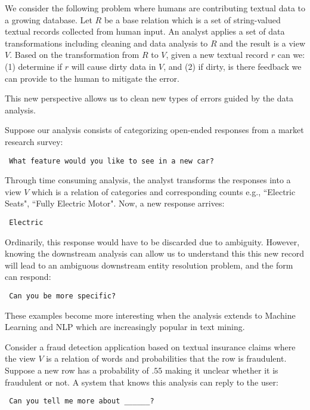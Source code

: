 We consider the following problem where humans are contributing textual data to a growing database. 
Let $R$ be a base relation which is a set of string-valued textual records collected from human input.
An analyst applies a set of data transformations including cleaning and data analysis to $R$ and the result is a view $V$.
Based on the transformation from $R$ to $V$, given a new textual record $r$ can we: (1) determine if $r$ will cause dirty data in $V$, and (2) if dirty, is there feedback we can provide to the human to mitigate the error. 

This new perspective allows us to clean new types of errors guided by the data analysis.
\begin{example}[Ambiguity]
Suppose our analysis consists of categorizing open-ended responses from a market research survey:

\vspace{0.5em}
\noindent \texttt{
What feature would you like to see in a new car?
}
\vspace{0.5em}

Through time consuming analysis, the analyst transforms the responses into a view $V$ which is a relation of categories and corresponding counts e.g., ``Electric Seats", ``Fully Electric Motor". 
Now, a new response arrives:

\vspace{0.5em}
\noindent \texttt{
Electric
}
\vspace{0.5em}

Ordinarily, this response would have to be discarded due to ambiguity.
However, knowing the downstream analysis can allow us to understand this this new record will lead to an ambiguous downstream entity resolution problem, and the form can respond:

\vspace{0.5em}
\noindent \texttt{
Can you be more specific? 
}

\end{example} 
These examples become more interesting when the analysis extends to Machine Learning and NLP which are increasingly popular in text mining. 
\begin{example}
Consider a fraud detection application based on textual insurance claims where the view $V$ is a relation of words and probabilities that the row is fraudulent.
Suppose a new row has a probability of $.55$ making it unclear whether it is fraudulent or not.
A system that knows this analysis can reply to the user:

\vspace{0.5em}
\noindent \texttt{
Can you tell me more about ______?
}
\vspace{0.5em}

\end{example} 

